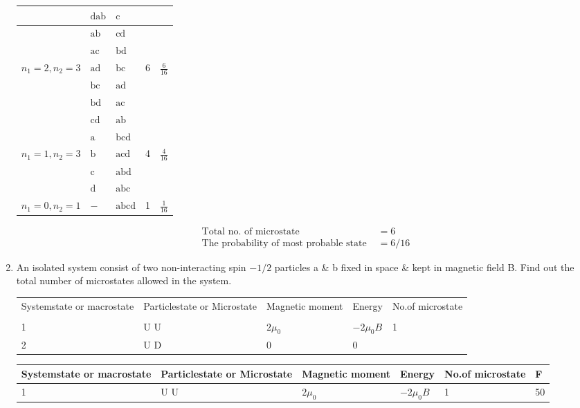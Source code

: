 \begin{enumerate}
\begin{center}
\begin{tabular}{|p{2.5cm}|p{2.7cm}|p{2.5cm}|p{2.7cm}|p{2.5cm}|}
		& $\mathrm{dab}$ & $\mathrm{c}$ & & \\
		\hline
		 &$\mathrm{ab}$&$\mathrm{cd}$ & &\\
		 &$\mathrm{ac}$&$\mathrm{bd}$ & &\\
		 $n_1=2,n_2=3$&$\mathrm{ad}$&$\mathrm{bc}$ &6&$\frac{6}{16}$\\
		 &$\mathrm{bc}$&$\mathrm{ad}$ & &\\
		 &$\mathrm{bd}$&$\mathrm{ac}$ & &\\
		 &$\mathrm{cd}$&$\mathrm{ab}$ & &\\
		 \hline
		  &$\mathrm{a}$&$\mathrm{bcd}$ & &\\
		$n_1=1,n_2=3$&$\mathrm{b}$&$\mathrm{acd}$ &4 &$\frac{4}{16}$\\
		  &$\mathrm{c}$&$\mathrm{abd}$ & &\\
		 &$\mathrm{d}$&$\mathrm{abc}$ & &\\
		  \hline
		  	$n_1=0,n_2=1$&$-$&$\mathrm{abcd}$ &1 &$\frac{1}{16}$\\
		  	 \hline
	\end{tabular}
\end{center}
\begin{answer}
	\begin{align*}
	\text{Total no. of microstate }&=6\\
	\text{The probability of most probable state }&=6/16
	\end{align*}
\end{answer}
	\item An isolated system consist of two non-interacting spin $-1/2$ particles a \& b fixed in space \& kept in magnetic field B. Find out the total number of microstates allowed in the system.\\
	\begin{center}
			\begin{tabular}{p{2.4cm}p{2.4cm}p{2.5cm}p{2.7cm}p{2.7cm}}
			Systemstate or macrostate & Particlestate or Microstate & Magnetic moment & Energy & No.of microstate\\\\
			1&U \quad U&$2\mu_0$&$-2\mu_0 B$&1\\
			2&U \quad D&0&0&
		\end{tabular}
	\end{center}
	
	
\begin{table}[htbp]
	\centering
	\begin{tabular}{|p{2.5cm}|p{2.5cm}|p{2.5cm}|p{2.5cm}|p{2.5cm}|p{1cm}|}
		\hline
		Systemstate or macrostate  &Particlestate or Microstate & Magnetic moment &Energy  &No.of microstate&{F}  \\ \hline
		1& U \quad U&$2\mu_0$ & $-2\mu_0 B$& 1 & 50  \\ \hline
	

\end{tabular}
\end{table}
\end{enumerate}
